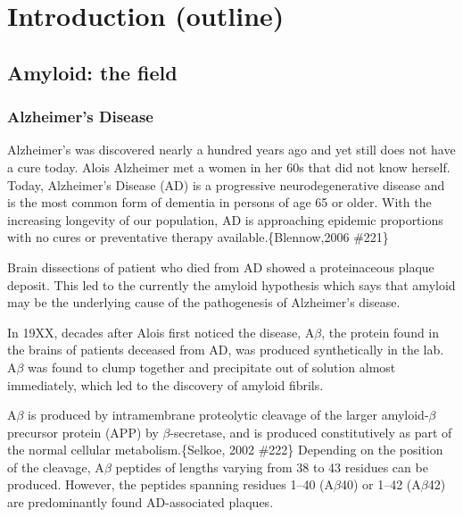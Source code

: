 \chapter{Introduction (outline)}

\section{Amyloid: the field}

\subsection{Alzheimer's Disease}
\begin{outline}[enumerate]
\1 Alzheimer's was discovered nearly a hundred years ago and yet still does not have a cure today.  Alois Alzheimer met a women in her 60s that did not know herself. Today, Alzheimer's Disease (AD) is a progressive neurodegenerative disease and is the most common form of dementia in persons of age 65 or older. With the increasing longevity of our population, AD is approaching epidemic proportions with no cures or preventative therapy available.\{Blennow,2006 \#221\}

\1 Brain dissections of patient who died from AD showed a proteinaceous plaque deposit.  This led to the currently the amyloid hypothesis which says that amyloid may be the underlying cause of the pathogenesis of Alzheimer's disease.  

\1 In 19XX, decades after Alois first noticed the disease, A$\beta$, the protein found in the brains of patients deceased from AD, was produced synthetically in the lab. A$\beta$ was found to clump together and precipitate out of solution almost immediately, which led to the discovery of amyloid fibrils.

\2 A$\beta$ is produced by intramembrane proteolytic cleavage of the larger amyloid-$\beta$ precursor protein (APP) by $\beta$-secretase, and is produced constitutively as part of the normal cellular metabolism.\{Selkoe, 2002 \#222\} Depending on the position of the cleavage, A$\beta$ peptides of lengths varying from 38 to 43 residues can be produced. However, the peptides spanning residues 1--40 (A$\beta$40) or 1--42 (A$\beta$42) are predominantly found AD-associated plaques.
\end{outline}


